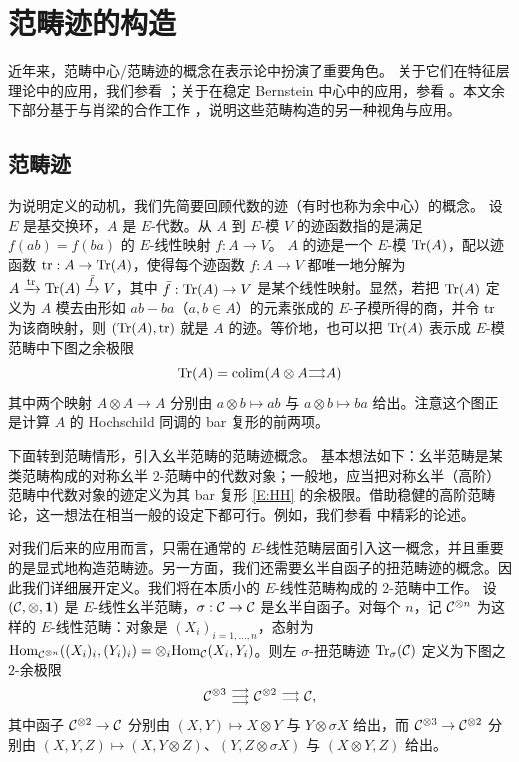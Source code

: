 \section{范畴迹的构造}
近年来，范畴中心/范畴迹的概念在表示论中扮演了重要角色。
关于它们在特征层理论中的应用，我们参看 \cite{BN,BFO,Lu3,Lu4,Lu5,Lu6}；关于在稳定 Bernstein 中心中的应用，参看 \cite{BKV}。本文余下部分基于与肖梁的合作工作 \cite{XZ}，说明这些范畴构造的另一种视角与应用。

\subsection{范畴迹}
\label{S: cat trace}
为说明定义的动机，我们先简要回顾代数的迹（有时也称为余中心）的概念。
设 $E$ 是基交换环，$A$ 是 $E$-代数。从 $A$ 到 $E$-模 $V$ 的迹函数指的是满足 $f(ab)=f(ba)$ 的 $E$-线性映射 $f: A\to V$。
$A$ 的迹是一个 $E$-模 ${\operatorname{Tr}}(A)$，配以迹函数 ${\operatorname{tr}}: A\to {\operatorname{Tr}}(A)$，使得每个迹函数 $f:A\to V$ 都唯一地分解为 $A\xrightarrow{{\operatorname{tr}}} {\operatorname{Tr}}(A)\xrightarrow{\bar{f}}V$，其中 $\bar{f}:{\operatorname{Tr}}(A)\to V$ 是某个线性映射。显然，若把 ${\operatorname{Tr}}(A)$ 定义为 $A$ 模去由形如 $ab-ba$（$a,b\in A$）的元素张成的 $E$-子模所得的商，并令 ${\operatorname{tr}}$ 为该商映射，则 $({\operatorname{Tr}}(A),{\operatorname{tr}})$ 就是 $A$ 的迹。等价地，也可以把 ${\operatorname{Tr}}(A)$ 表示成 $E$-模范畴中下图之余极限
\begin{equation}
\label{E:HH}
{\operatorname{Tr}}(A)=\operatorname{colim}(A\otimes A\substack{\longrightarrow\\[-1em] \longrightarrow}  A)
\end{equation}
其中两个映射 $A\otimes A\to A$ 分别由 $a\otimes b\mapsto ab$ 与 $a\otimes b\mapsto ba$ 给出。注意这个图正是计算 $A$ 的 Hochschild 同调的 bar 复形的前两项。

下面转到范畴情形，引入幺半范畴的范畴迹概念。
基本想法如下：幺半范畴是某类范畴构成的对称幺半 $2$-范畴中的代数对象；一般地，应当把对称幺半（高阶）范畴中代数对象的迹定义为其 bar 复形 \eqref{E:HH} 的余极限。借助稳健的高阶范畴论，这一想法在相当一般的设定下都可行。例如，我们参看 \cite{BN} 中精彩的论述。

对我们后来的应用而言，只需在通常的 $E$-线性范畴层面引入这一概念，并且重要的是显式地构造范畴迹。另一方面，我们还需要幺半自函子的扭范畴迹的概念。因此我们详细展开定义。我们将在本质小的 $E$-线性范畴构成的 $2$-范畴中工作。
设 $({\mathcal C},\otimes,\mathbf{1})$ 是 $E$-线性幺半范畴，$\sigma: {\mathcal C}\to {\mathcal C}$ 是幺半自函子。对每个 $n$，记 ${\mathcal C}^{\otimes n}$ 为这样的 $E$-线性范畴：对象是 $(X_i)_{i=1,\ldots,n}$，态射为 ${\operatorname{Hom}}_{{\mathcal C}^{\otimes n}}((X_i)_i, (Y_i)_i)=\otimes_i {\operatorname{Hom}}_{\mathcal C}(X_i,Y_i)$。则左 $\sigma$-扭范畴迹 ${\operatorname{Tr}}_\sigma({\mathcal C})$ 定义为下图之 $2$-余极限
\[
\mC^{\otimes 3}\ \substack{\longrightarrow\\[-1em] \longrightarrow\\[-1em] \longrightarrow} \ \mC^{\otimes 2}\ \substack{\longrightarrow\\[-1em] \longrightarrow} \ \mC,
\]
其中函子 ${\mathcal C}^{\otimes 2}\to {\mathcal C}$ 分别由 $(X,Y)\mapsto X\otimes Y$ 与 $Y\otimes \sigma X$ 给出，而 ${\mathcal C}^{\otimes 3}\to {\mathcal C}^{\otimes 2}$ 分别由 $(X,Y,Z)\mapsto (X,Y\otimes Z)$、$(Y, Z\otimes \sigma X)$ 与 $(X\otimes Y,Z)$ 给出。

